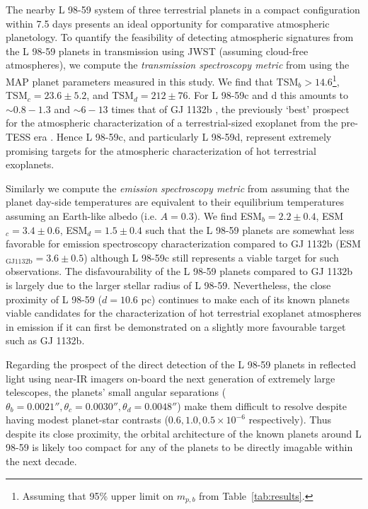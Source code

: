 \documentclass[longauth]{aa}
\begin{document}
The nearby L 98-59 system of three terrestrial planets in a compact configuration within 7.5 days presents an ideal opportunity for comparative atmospheric planetology. To quantify the feasibility of detecting atmospheric signatures from the L 98-59 planets in transmission using JWST (assuming cloud-free atmospheres), we compute the \emph{transmission spectroscopy metric} from \cite{kempton18} using the MAP planet parameters measured in this study. We find that TSM$_b > 14.6$\footnote{Assuming that 95\% upper limit on $m_{p,b}$ from Table~\ref{tab:results}.}, TSM$_c=23.6\pm 5.2$, and TSM$_d=212\pm 76$. For L 98-59c and d this amounts to $\sim 0.8-1.3$ and $\sim 6-13$ times that of GJ 1132b \citep{dittmann17a,bonfils18}, the previously `best' prospect for the atmospheric characterization of a terrestrial-sized exoplanet from the pre-TESS era \citep{morley17}. Hence L 98-59c, and particularly L 98-59d, represent extremely promising targets for the atmospheric characterization of hot terrestrial exoplanets.

Similarly we compute the \emph{emission spectroscopy metric} from \cite{kempton18} assuming that the planet day-side temperatures are equivalent to their equilibrium temperatures assuming an Earth-like albedo (i.e. $A=0.3$). We find ESM$_b=2.2\pm 0.4$, ESM$_c=3.4\pm 0.6$, ESM$_d=1.5\pm 0.4$ such that the L 98-59 planets are somewhat less favorable for emission spectroscopy characterization compared to GJ 1132b (ESM$_{\text{GJ1132b}}=3.6\pm 0.5$) although L 98-59c still represents a viable target for such observations. The disfavourability of the L 98-59 planets compared to GJ 1132b is largely due to the larger stellar radius of L 98-59. Nevertheless, the close proximity of L 98-59 ($d=10.6$ pc) continues to make each of its known planets viable candidates for the characterization of hot terrestrial exoplanet atmospheres in emission if it can first be demonstrated on a slightly more favourable target such as GJ 1132b.

Regarding the prospect of the direct detection of the L 98-59 planets in reflected light using near-IR imagers on-board the next generation of extremely large telescopes, the planets' small angular separations ($\theta_b=0.0021'', \theta_c=0.0030'', \theta_d=0.0048''$) make them difficult to resolve despite having modest planet-star contrasts ($0.6,1.0,0.5 \times 10^{-6}$ respectively). Thus despite its close proximity, the orbital architecture of the known planets around L 98-59 is likely too compact for any of the planets to be directly imagable within the next decade.
\end{document}
